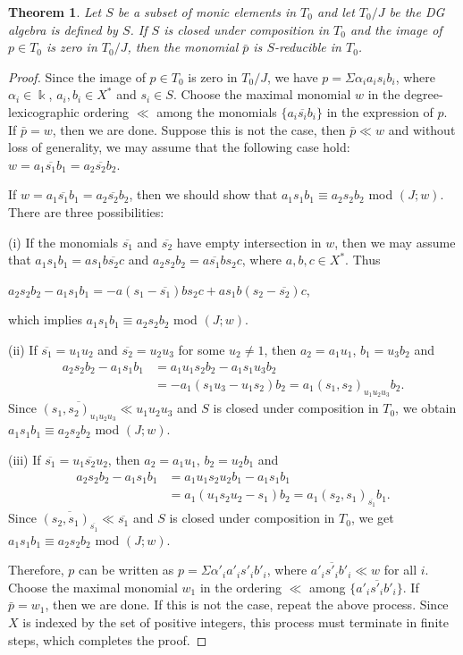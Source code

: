 \documentclass[a4paper,10pt]{amsart}
\newtheorem{theorem}{Theorem}[section]
\theoremstyle{definition}
\theoremstyle{remark}
\numberwithin{equation}{section}
\begin{document}
\begin{theorem}
Let $S$ be a subset of monic elements in $T_0$ and let $T_0/J$ be
the DG algebra is defined by $S$. If $S$ is closed under composition
in $T_0$ and the image of $p\in T_0$ is zero in $T_0/J$, then the
monomial $\bar{p}$ is $S$-reducible in $T_0$.
\end{theorem}

\begin{proof}
Since the image of $p\in T_0$ is zero in $T_0/J$, we have
$p=\Sigma\alpha_ia_is_ib_i$, where $\alpha_i\in \Bbbk$, $a_i, b_i\in
X^*$ and $s_i\in S$. Choose the maximal monomial $w$ in the
degree-lexicographic ordering $\ll$ among the monomials
$\{a_i\overline{s_i}b_i\}$ in the expression of $p$. If $\bar{p}=w$,
then we are done. Suppose this is not the case, then $\bar{p}\ll w$
and without loss of generality, we may assume that the following
case hold: $w=a_1\overline{s_1}b_1=a_2\overline{s_2}b_2$.

If $w=a_1\overline{s_1}b_1=a_2\overline{s_2}b_2$, then we should
show that $a_1s_1b_1\equiv a_2s_2b_2$ mod $(J; w)$. There are three
possibilities:

(i) If the monomials $\overline{s_1}$ and $\overline{s_2}$ have
empty intersection in $w$, then we may assume that
$a_1s_1b_1=as_1b\overline{s_2}c$ and
$a_2s_2b_2=a\overline{s_1}bs_2c$, where $a, b, c\in X^*$. Thus
\begin{center}
$a_2s_2b_2-a_1s_1b_1=-a(s_1-\overline{s_1})bs_2c+as_1b(s_2-\overline{s_2})c$,
\end{center}
which implies $a_1s_1b_1\equiv a_2s_2b_2$ mod $(J; w)$.

(ii) If $\overline{s_1}=u_1u_2$ and $\overline{s_2}=u_2u_3$ for some
$u_2\neq 1$, then $a_2=a_1u_1$, $b_1=u_3b_2$ and
\begin{align*}
a_2s_2b_2-a_1s_1b_1&=a_1u_1s_2b_2-a_1s_1u_3b_2\\&=-a_1(s_1u_3-u_1s_2)b_2=a_1(s_1,
s_2)_{u_1u_2u_3}b_2.
\end{align*}
Since $\overline{(s_1, s_2)_{u_1u_2u_3}}\ll u_1u_2u_3$ and $S$ is
closed under composition in $T_0$, we obtain $a_1s_1b_1\equiv
a_2s_2b_2$ mod $(J; w)$.

(iii) If $\overline{s_1}=u_1\overline{s_2}u_2$, then $a_2=a_1u_1$,
$b_2=u_2b_1$ and
\begin{align*}
a_2s_2b_2-a_1s_1b_1&=a_1u_1s_2u_2b_1-a_1s_1b_1\\&=a_1(u_1s_2u_2-s_1)b_2=a_1(s_2,
s_1)_{\overline{s_1}}b_1.
\end{align*}
Since $\overline{(s_2, s_1)_{\overline{s_1}}}\ll \overline{s_1}$ and
$S$ is closed under composition in $T_0$, we get $a_1s_1b_1\equiv
a_2s_2b_2$ mod $(J; w)$.

Therefore, $p$ can be written as $p=\Sigma\alpha'_ia'_is'_ib'_i$,
where $a'_i\overline{s'_i}b'_i\ll w$ for all $i$. Choose the maximal
monomial $w_1$ in the ordering $\ll$ among
$\{a'_i\overline{s'_i}b'_i\}$. If $\bar{p}=w_1$, then we are done.
If this is not the case, repeat the above process. Since $X$ is
indexed by the set of positive integers, this process must terminate
in finite steps, which completes the proof.
\end{proof}
\end{document}
